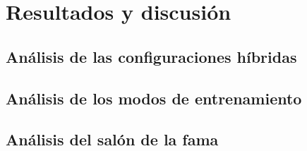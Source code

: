 \chapter{Resultados y discusión} \label{chap:resultados}

\section{Análisis de las configuraciones híbridas} \label{sec:analisis_configuraciones_hibridas}

\section{Análisis de los modos de entrenamiento} \label{sec:analisis_modos_entrenamiento}

\section{Análisis del salón de la fama} \label{sec:analisis_salon_fama}





